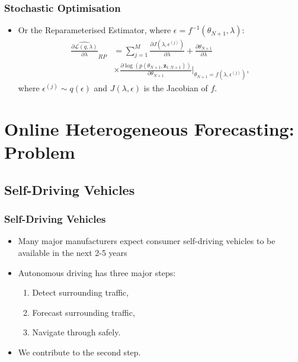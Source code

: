 \documentclass[11pt]{beamer}\usepackage[]{graphicx}\usepackage[]{color}
\begin{document}
\begin{frame}
\frametitle{Stochastic Optimisation}
\begin{itemize}
\item Or the Reparameterised Estimator, where $\epsilon = f^{-1}(\theta_{N+1}, \lambda)$:
\begin{align*}
\widehat{\frac{\partial\mathcal{L}(q, \lambda)}{\partial \lambda}}_{RP} &= \sum_{j = 1}^M \frac{\partial J(\lambda, \epsilon^{(j)})}{\partial \lambda} + \frac{\partial \theta_{N+1}}{\partial \lambda} \\
&\times \frac{\partial \log(p(\theta_{N+1}, \textbf{z}_{1:N+1}))}{\partial \theta_{N+1}} \bigg\rvert_{\theta_{N+1} = f(\lambda, \epsilon^{(j)})},
\end{align*}
where $\epsilon^{(j)} \sim q(\epsilon)$ and $J(\lambda, \epsilon)$ is the Jacobian of $f$.
\end{itemize}
\end{frame}

\section{Online Heterogeneous Forecasting: Problem}
\subsection{Self-Driving Vehicles}

\begin{frame}
\frametitle{Self-Driving Vehicles}
\begin{itemize}
\item Many major manufacturers expect consumer self-driving vehicles to be available in the next 2-5 years
\pause
\item Autonomous driving has three major steps:
\begin{enumerate}
\item Detect surrounding traffic,
\item Forecast surrounding traffic,
\item Navigate through safely.
\end{enumerate}
\item We contribute to the second step.
\end{itemize}
\end{frame}
\end{document}

